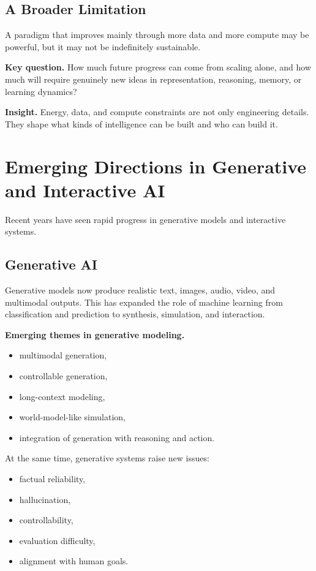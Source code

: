 \subsection{A Broader Limitation}

A paradigm that improves mainly through more data and more compute may be powerful, but it may not be indefinitely sustainable.

\medskip

\noindent
\textbf{Key question.}
How much future progress can come from scaling alone, and how much will require genuinely new ideas in representation, reasoning, memory, or learning dynamics?

\medskip

\noindent
\textbf{Insight.}
Energy, data, and compute constraints are not only engineering details. They shape what kinds of intelligence can be built and who can build it.

\section{Emerging Directions in Generative and Interactive AI}

Recent years have seen rapid progress in generative models and interactive systems.

\subsection{Generative AI}

Generative models now produce realistic text, images, audio, video, and multimodal outputs. This has expanded the role of machine learning from classification and prediction to synthesis, simulation, and interaction.

\medskip

\noindent
\textbf{Emerging themes in generative modeling.}
\begin{itemize}
    \item multimodal generation,
    \item controllable generation,
    \item long-context modeling,
    \item world-model-like simulation,
    \item integration of generation with reasoning and action.
\end{itemize}

\medskip

\noindent
At the same time, generative systems raise new issues:
\begin{itemize}
    \item factual reliability,
    \item hallucination,
    \item controllability,
    \item evaluation difficulty,
    \item alignment with human goals.
\end{itemize}

